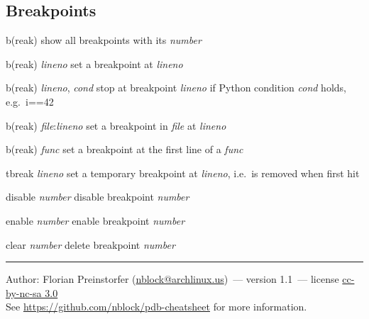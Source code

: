 \documentclass[10pt,landscape,a4paper]{article}
\makeatletter
\newcommand{\theauthor}{Florian Preinstorfer (\href{mailto:nblock@archlinux.us}{nblock@archlinux.us})}
\newcommand{\theversion}{1.1}
\makeatother
\begin{document}
\begin{multicols}{2}
    \subsection{Breakpoints}
      \begin{eqlist}
        \item[b(reak)] show all breakpoints with its \textit{number}
        \item[b(reak) \textit{lineno}] set a breakpoint at \textit{lineno}
        \item[b(reak) \textit{lineno}, \textit{cond}] stop at breakpoint \textit{lineno} if Python condition \textit{cond} holds, e.g.\ i==42
        \item[b(reak) \textit{file}:\textit{lineno}] set a breakpoint in \textit{file} at \textit{lineno}
        \item[b(reak) \textit{func}] set a breakpoint at the first line of a \textit{func}
        \item[tbreak \textit{lineno}] set a temporary breakpoint at \textit{lineno}, i.e.\ is removed when first hit
        \item[disable \textit{number}] disable breakpoint \textit{number}
        \item[enable \textit{number}] enable breakpoint \textit{number}
        \item[clear \textit{number}] delete breakpoint \textit{number}
      \end{eqlist}

    \small{
    \hrule
    Author: \theauthor~--- version \theversion~--- license \href{https://creativecommons.org/licenses/by-nc-sa/3.0}{cc-by-nc-sa 3.0}\\
    See \url{https://github.com/nblock/pdb-cheatsheet} for more information.
    }
  \end{multicols}
\end{document}

